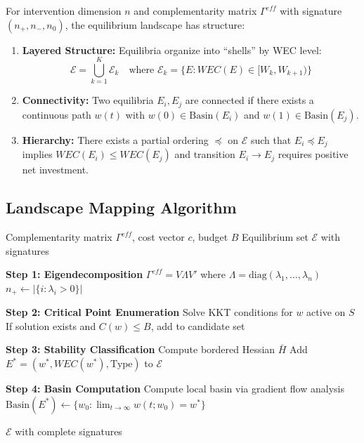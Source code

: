 \begin{theorem}
\label{thm:meq-landscape}

For intervention dimension $n$ and complementarity matrix $\Gamma^{eff}$ with
signature $(n_+, n_-, n_0)$, the equilibrium landscape has structure:

\begin{enumerate}
    \item \textbf{Layered Structure:} Equilibria organize into ``shells'' by WEC level:
    \begin{equation}
    \mathcal{E} = \bigcup_{k=1}^{K} \mathcal{E}_k \quad \text{where } \mathcal{E}_k = \{E : WEC(E) \in [W_k, W_{k+1})\}
    \end{equation}

    \item \textbf{Connectivity:} Two equilibria $E_i, E_j$ are connected if there
    exists a continuous path $w(t)$ with $w(0) \in \text{Basin}(E_i)$ and
    $w(1) \in \text{Basin}(E_j)$.

    \item \textbf{Hierarchy:} There exists a partial ordering $\preceq$ on $\mathcal{E}$
    such that $E_i \preceq E_j$ implies $WEC(E_i) \leq WEC(E_j)$ and transition
    $E_i \to E_j$ requires positive net investment.
\end{enumerate}
\end{theorem}

\subsection{Landscape Mapping Algorithm}

\begin{algorithm}[H]
\caption{Equilibrium Landscape Mapping (MAP)}
\label{alg:landscape}
\begin{algorithmic}[1]
\Require Complementarity matrix $\Gamma^{eff}$, cost vector $c$, budget $B$
\Ensure Equilibrium set $\mathcal{E}$ with signatures

\State \textbf{Step 1: Eigendecomposition}
\State $\Gamma^{eff} = V \Lambda V'$ where $\Lambda = \text{diag}(\lambda_1, ..., \lambda_n)$
\State $n_+ \gets |\{i : \lambda_i > 0\}|$

\State \textbf{Step 2: Critical Point Enumeration}
    \State Solve KKT conditions for $w$ active on $S$
    \State If solution exists and $C(w) \leq B$, add to candidate set
\EndFor

\State \textbf{Step 3: Stability Classification}
    \State Compute bordered Hessian $\bar{H}$
        \State Add $E^* = (w^*, WEC(w^*), \text{Type})$ to $\mathcal{E}$
    \EndIf
\EndFor

\State \textbf{Step 4: Basin Computation}
    \State Compute local basin via gradient flow analysis
    \State $\text{Basin}(E^*) \gets \{w_0 : \lim_{t \to \infty} w(t; w_0) = w^*\}$
\EndFor

\Return $\mathcal{E}$ with complete signatures
\end{algorithmic}
\end{algorithm}

